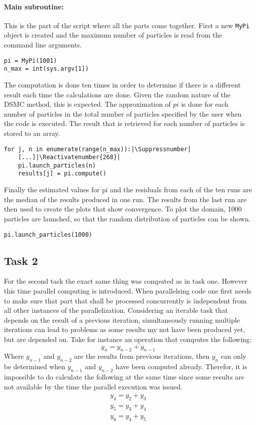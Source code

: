 \documentclass{aa}
\begin{document}
\paragraph{Main subroutine:}
This is the part of the script where all the parts come together. First a new \verb+MyPi+
object is created and the maximum number of particles is read from the command line arguments.
\begin{lstlisting}[firstnumber=236]
pi = MyPi(1001)
n_max = int(sys.argv[1])
\end{lstlisting}
The computation is done ten times in order to determine if there is a different result each
time the calculations are done. Given the random nature of the DSMC method, this is expected.
The approximation of \(pi\) is done for each number of particles in the total number of
particles specified by the user when the code is executed. The result that is retrieved for
each number of particles is stored to an array.
\begin{lstlisting}[firstnumber=257]
for j, n in enumerate(range(n_max)):|\Suppressnumber|
    [...]|\Reactivatenumber{268}|
    pi.launch_particles(n)
    results[j] = pi.compute()
\end{lstlisting}
Finally the estimated values for pi and the residuals from each of the ten runs are the median
of the results produced in one run. The results from the last run are then used to create the
plots that show convergence. To plot the domain, 1000 particles are launched, so that the
random distribution of particles can be shown.
\begin{lstlisting}[firstnumber=290]
pi.launch_particles(1000)
\end{lstlisting}

\subsection{Task 2}%
\label{sub:task_2}

For the second task the exact same thing was computed as in task one. However this time
parallel computing is introduced. When parallelsing code one first needs to make sure that part
that shall be processed concurrently is independent from all other instances of the
parallelization. Considering an iterable task that depends on the result of a previous
iteration, simultaneously running multiple iterations can lead to problems as some results my
not have been produced yet, but are depended on. Take for instance an operation that computes
the following:
\begin{equation}
    \label{eqn:previous_dependence}
    y_{n} = y_{n-2} + y_{n-1}
\end{equation}
Where \(y_{n-1}\) and \(y_{n-2}\) are the results from previous iterations, then \(y_n\) can
only be determined when \(y_{n-1}\) and \(y_{n-2}\) have been computed already. Therefor, it is
impossible to do calculate the following at the same time since some results are not available
by the time the parallel execution was issued.
\begin{eqnarray}
    y_4 = y_2 + y_3\\
    y_5 = y_3 + y_4\\
    y_6 = y_4 + y_5
\end{eqnarray}
\end{document}
